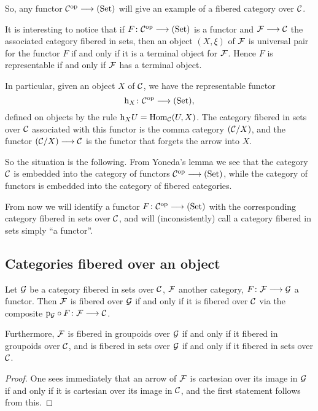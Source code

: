 \begin{3   FIBERED CATEGORIES}
\begin{3.4 Functors and cats fibered in sets}
So, any functor $\cC\op  \arr \catset $ will give an example of a fibered category over $\mathcal{C}$.

\begin{remark}
It is interesting to notice that if $F \colon \cC\op \arr \catset$ is a functor and $\cF \arr \cC$ the associated category fibered in sets, then an object $(X, \xi)$ of $\mathcal{F}$ is universal pair for the functor $F$ if and only if it is a terminal object for $\mathcal{F}$. Hence $F$ is representable if and only if $\mathcal{F}$ has a terminal object.
\end{remark}

In particular, given an object $X$ of $\mathcal{C}$, we have the representable functor 
   \[
   \h_X\colon \cC\op \arr \catset,
   \]
defined on objects by the rule $\mathrm{h}_X U = \operatorname{Hom}_{\mathcal{C}}(U,X)$. The category fibered in sets over $\mathcal{C}$ associated with this functor is the comma category $(\mathcal{C}/X)$, and the functor $(\cC/X) \arr \cC$ is the functor that forgets the arrow into $X$.
 
So the situation is the following. From Yoneda's lemma we see that the category $\mathcal{C}$ is embedded into the category of functors $\cC\op \arr \catset$, while the category of functors is embedded into the category of fibered categories.

From now we will identify a functor $F \colon \cC\op \arr \catset$ with the corresponding category fibered in sets over $\mathcal{C}$, and will (inconsistently) call a category fibered in sets simply ``a functor''.


\subsection{Categories fibered over an object}
\label{subsec:fibered-over}


\begin{proposition}\label{prop:fibered-over}

Let $\mathcal{G}$ be a category fibered in sets over $\mathcal{C}$, $\mathcal{F}$ another category, $F \colon \cF \arr \cG$ a functor. Then $\mathcal{F}$ is fibered over $\mathcal{G}$ if and only if it is fibered over $\mathcal{C}$ via the composite $\p_{\cG} \circ F \colon \cF \arr \cC$.

Furthermore, $\mathcal{F}$ is fibered in groupoids over $\mathcal{G}$ if and only if it fibered in groupoids over $\mathcal{C}$, and is fibered in sets over $\mathcal{G}$ if and only if it fibered in sets over $\mathcal{C}$.
\end{proposition}

\begin{proof}
One sees immediately that an arrow of $\mathcal{F}$ is cartesian over its image in $\mathcal{G}$ if and only if it is cartesian over its image in $\mathcal{C}$, and the first statement follows from this.


\end{proof}
\end{3.4 Functors and cats fibered in sets}
\end{3   FIBERED CATEGORIES}
